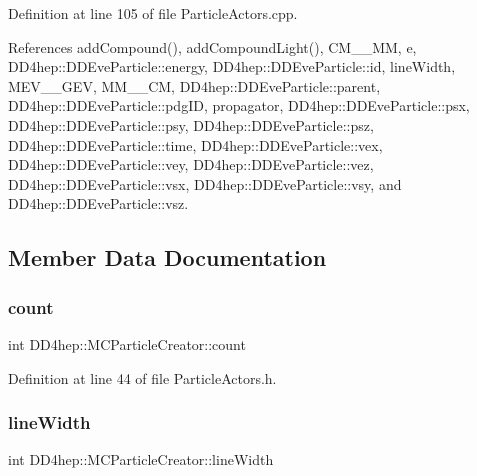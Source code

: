Definition at line 105 of file Particle\+Actors.\+cpp.



References add\+Compound(), add\+Compound\+Light(), C\+M\+\_\+\_\+\+MM, e, D\+D4hep\+::\+D\+D\+Eve\+Particle\+::energy, D\+D4hep\+::\+D\+D\+Eve\+Particle\+::id, line\+Width, M\+E\+V\+\_\+\_\+\+G\+EV, M\+M\+\_\+\_\+\+CM, D\+D4hep\+::\+D\+D\+Eve\+Particle\+::parent, D\+D4hep\+::\+D\+D\+Eve\+Particle\+::pdg\+ID, propagator, D\+D4hep\+::\+D\+D\+Eve\+Particle\+::psx, D\+D4hep\+::\+D\+D\+Eve\+Particle\+::psy, D\+D4hep\+::\+D\+D\+Eve\+Particle\+::psz, D\+D4hep\+::\+D\+D\+Eve\+Particle\+::time, D\+D4hep\+::\+D\+D\+Eve\+Particle\+::vex, D\+D4hep\+::\+D\+D\+Eve\+Particle\+::vey, D\+D4hep\+::\+D\+D\+Eve\+Particle\+::vez, D\+D4hep\+::\+D\+D\+Eve\+Particle\+::vsx, D\+D4hep\+::\+D\+D\+Eve\+Particle\+::vsy, and D\+D4hep\+::\+D\+D\+Eve\+Particle\+::vsz.



\subsection{Member Data Documentation}
\hypertarget{struct_d_d4hep_1_1_m_c_particle_creator_a91d20c4304e3781732682f75271f45ef}{}\label{struct_d_d4hep_1_1_m_c_particle_creator_a91d20c4304e3781732682f75271f45ef} 
\subsubsection{\texorpdfstring{count}{count}}
{\footnotesize\ttfamily int D\+D4hep\+::\+M\+C\+Particle\+Creator\+::count}



Definition at line 44 of file Particle\+Actors.\+h.

\hypertarget{struct_d_d4hep_1_1_m_c_particle_creator_a105c9287f1f91d862a3d77d97be0557d}{}\label{struct_d_d4hep_1_1_m_c_particle_creator_a105c9287f1f91d862a3d77d97be0557d} 
\subsubsection{\texorpdfstring{line\+Width}{lineWidth}}
{\footnotesize\ttfamily int D\+D4hep\+::\+M\+C\+Particle\+Creator\+::line\+Width}




